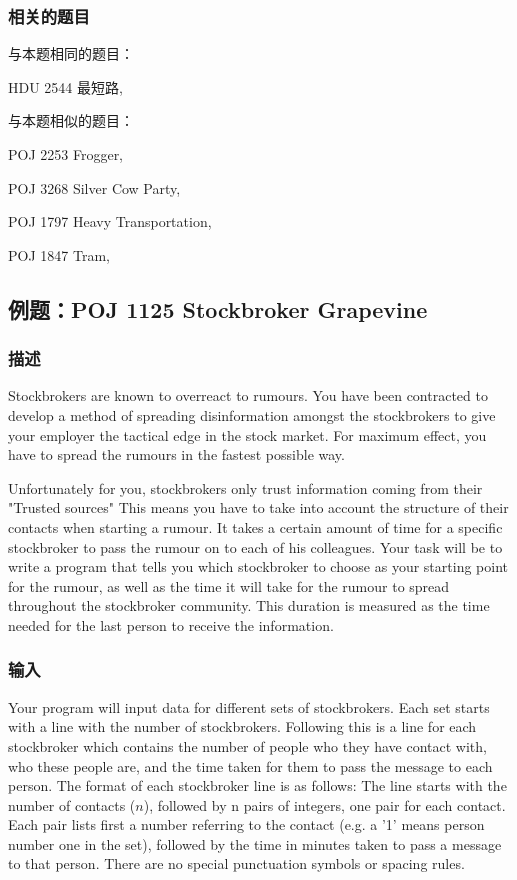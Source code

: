 \subsubsection{相关的题目}
与本题相同的题目：
\begindot
\item HDU 2544 最短路, 
\myenddot

与本题相似的题目：
\begindot
\item POJ 2253 Frogger, 
\item POJ 3268 Silver Cow Party, 
\item POJ 1797 Heavy Transportation, 
\item POJ 1847 Tram, 
\myenddot


\subsection{例题：POJ 1125 Stockbroker Grapevine}
\subsubsection{描述}
Stockbrokers are known to overreact to rumours. You have been contracted to develop a method of spreading disinformation amongst the stockbrokers to give your employer the tactical edge in the stock market. For maximum effect, you have to spread the rumours in the fastest possible way. 

Unfortunately for you, stockbrokers only trust information coming from their "Trusted sources" This means you have to take into account the structure of their contacts when starting a rumour. It takes a certain amount of time for a specific stockbroker to pass the rumour on to each of his colleagues. Your task will be to write a program that tells you which stockbroker to choose as your starting point for the rumour, as well as the time it will take for the rumour to spread throughout the stockbroker community. This duration is measured as the time needed for the last person to receive the information.

\subsubsection{输入}
Your program will input data for different sets of stockbrokers. Each set starts with a line with the number of stockbrokers. Following this is a line for each stockbroker which contains the number of people who they have contact with, who these people are, and the time taken for them to pass the message to each person. The format of each stockbroker line is as follows: The line starts with the number of contacts ($n$), followed by n pairs of integers, one pair for each contact. Each pair lists first a number referring to the contact (e.g. a '1' means person number one in the set), followed by the time in minutes taken to pass a message to that person. There are no special punctuation symbols or spacing rules. 

